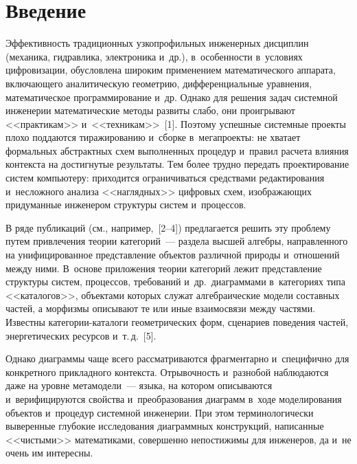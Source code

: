 \thispagestyle{headings}

\begin{multicols}{2}

\label{st\stat}
  
\section{Введение}


     Эффективность традиционных узкопрофильных инженерных дисциплин 
(механика, гидравлика, электроника и~др.), в~особенности в~условиях 
циф\-ро\-ви\-за\-ции, обусловлена широким применением математического аппарата, 
включающего аналитическую геометрию, дифференциальные уравнения, 
математическое программирование и~др. Однако для решения задач системной 
инженерии математические методы развиты слабо, они проигрывают 
<<практикам>> и~<<техникам>>~[1]. Поэтому успешные системные проекты 
плохо поддаются тиражированию и~сборке в~мегапроекты: не хватает 
формальных абстрактных схем выполненных процедур и~правил расчета 
влияния контекста на достигнутые результаты. Тем более трудно передать 
проектирование систем компьютеру: приходится ограничиваться средствами 
редактирования и~несложного анализа <<наглядных>> цифровых схем, 
изображающих придуманные инженером структуры систем и~процессов.
     
     В ряде публикаций (см., например,~[2--4]) предлагается решить эту 
проблему путем привлечения теории категорий~--- раздела высшей алгебры, 
направленного на унифицированное представление объектов различной 
природы и~отношений между ними. В~основе приложения теории категорий 
лежит представление структуры систем, процессов, требований и~др.\ 
диаграммами в~категориях типа <<каталогов>>, объектами которых служат 
ал\-геб\-ра\-и\-че\-ские модели составных частей, а морфизмы описывают те или иные 
взаимосвязи между частями. Известны ка\-те\-го\-рии-ка\-та\-ло\-ги 
геометрических форм, сценариев поведения частей, энергетических ресурсов 
и~т.\,д.~[5].
     
     Однако диаграммы чаще всего рассматриваются фрагментарно 
и~специфично для конкретного прикладного контекста. Отрывочность 
и~разнобой наблюдаются даже на уровне метамодели~--- языка, на котором 
описываются и~верифицируются свойства и~преобразования диаграмм в~ходе 
моделирования объектов и~процедур системной инженерии. При этом 
терминологически выверенные глубокие исследования диаграммных 
конструкций, написанные <<чистыми>> математиками, совершенно 
непостижимы для инженеров, да и~не очень им интересны.


\end{multicols}
